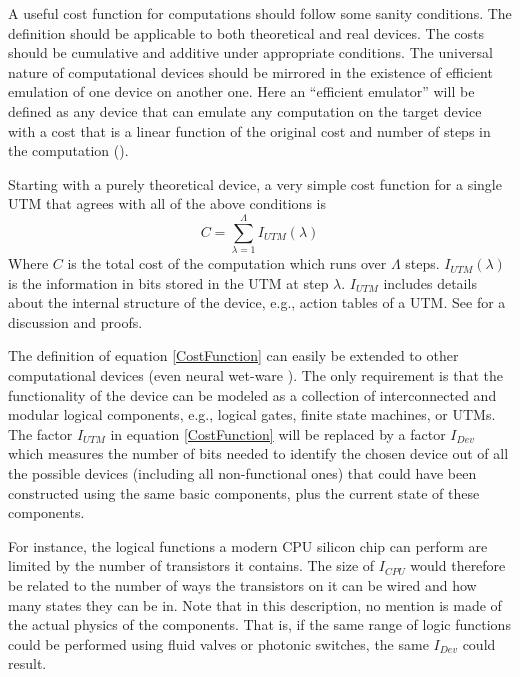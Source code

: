 \documentclass{article}
\begin{document}
A useful cost function for computations should follow some sanity conditions.
The definition should be applicable to both theoretical and real devices. The costs
should be cumulative and additive under appropriate conditions. The universal nature of 
computational devices should be mirrored in the existence of efficient emulation of one 
device on another one. Here an ``efficient emulator'' will be defined as any device that 
can emulate any computation on the target device with a cost that is a linear function 
of the original cost and number of steps in the computation (\cite{Son0911-5262}).

Starting with a purely theoretical device, a very simple cost function for a single 
UTM that agrees with all of the above conditions is
\begin{equation}\label{CostFunction}
C = \sum_{\lambda=1}^{\Lambda} I_{UTM}(\lambda)
\end{equation}
Where $C$ is the total cost of the computation which runs over $\Lambda$ steps.
$I_{UTM}(\lambda)$ is the information in bits stored in the UTM at step
$\lambda$. $I_{UTM}$ includes details about the internal structure 
of the device, e.g., action tables of a UTM. See \cite{Son0911-5262} 
for a discussion and proofs.

The definition of equation \ref{CostFunction} can easily be extended to other
computational devices (even neural wet-ware \cite{Son0911-5262}).
The only requirement is that the functionality of the device can be modeled
as a collection of interconnected and modular logical components, e.g., 
logical gates, finite state machines, or UTMs. The factor $I_{UTM}$ 
in equation \ref{CostFunction} will
be replaced by a factor $I_{Dev}$ which measures the number of bits
needed to identify the chosen device out of all the possible devices
(including all non-functional ones) that could have been constructed 
using the same basic components, 
plus the current state of these components.

For instance, the logical functions a modern CPU silicon chip can
perform are limited by the number of transistors it contains. The
size of $I_{CPU}$ would therefore be related to the number of ways
the transistors on it can be wired and how many states they can be in.
Note that in this description, no mention is made of the actual
physics of the components. That is, if the same range of logic 
functions could be performed using fluid valves or photonic 
switches, the same $I_{Dev}$ could result.
\end{document}
